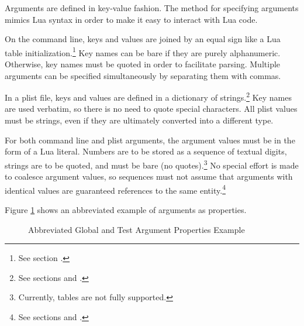 Arguments are defined in key-value fashion.  The method for specifying
arguments mimics Lua syntax in order to make it easy to interact with Lua code.

On the command line, keys and values are joined by an equal sign like a Lua
table initialization.\footnote{See section
.\label{fn:CmdLineArgs}}  Key names can be
bare if they are purely alphanumeric.  Otherwise, key names must be quoted in
order to facilitate parsing.  Multiple arguments can be specified
simultaneously by separating them with commas.

In a plist file, keys and values are defined in a dictionary of
strings.\footnote{See sections  and
.}  Key names are used verbatim, so there is
no need to quote special characters.  All plist values must be strings, even if
they are ultimately converted into a different type.

For both command line and plist arguments, the argument values must be in the
form of a Lua literal.  Numbers are to be stored as a sequence of textual
digits, strings are to be quoted, and  must be bare (no
quotes).\footnote{Currently, tables are not fully supported.}  No special
effort is made to coalesce argument values, so sequences must not assume that
arguments with identical values are guaranteed references to the same
entity.\footnote{See sections  and
.}

Figure \ref{fig:ArgumentProperties} shows an abbreviated example of arguments
as properties.

\begin{figure}[h]

	\begin{CenteredPropertyList}{18em}
	\end{CenteredPropertyList}

	\caption{Abbreviated Global and Test Argument Properties Example}
	\label{fig:ArgumentProperties}

\end{figure}

